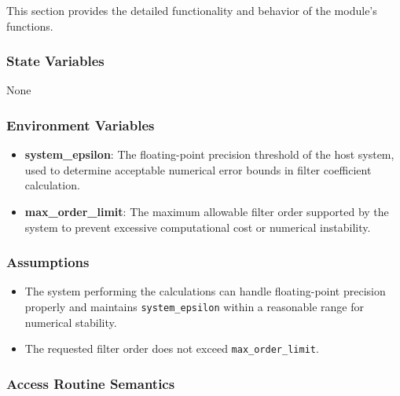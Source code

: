 \documentclass[12pt, titlepage]{article}
\begin{document}
This section provides the detailed functionality and behavior of the module’s
functions.

\subsubsection{State Variables}

None

\subsubsection{Environment Variables}

\begin{itemize}
\item \textbf{system\_epsilon}: The floating-point precision threshold of the
host system, used to determine acceptable numerical error bounds in filter
coefficient calculation.
\item \textbf{max\_order\_limit}: The maximum allowable filter order supported
by the system to prevent excessive computational cost or numerical instability.
\end{itemize}

\subsubsection{Assumptions}

\begin{itemize}
\item The system performing the calculations can handle floating-point precision
properly and maintains \texttt{system\_epsilon} within a reasonable range for
numerical stability.
\item The requested filter order does not exceed \texttt{max\_order\_limit}.
\end{itemize}

\subsubsection{Access Routine Semantics}
\end{document}
